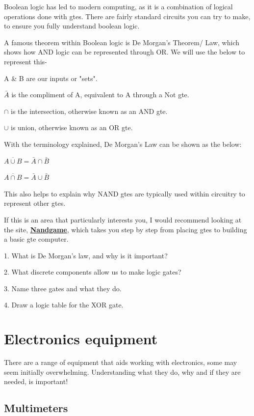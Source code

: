 \documentclass[a4paper,11pt]{report}
\newcommand{\Quiz}[1] %
{
\par\noindent %
\phantomsection %
\todo[inline, color=blue!30]{\textbf{#1}} %
\vspace{1em} %
}
\let\oldhref\href %
\renewcommand{\href}[2]{\oldhref{#1}{\bfseries#2}}
\begin{document}
Boolean logic has led to modern computing, as it is a combination of logical operations done with \gls{gte}s. There are fairly standard circuits you can try to make, to ensure you fully understand boolean logic.

A famous theorem within Boolean logic is De Morgan's Theorem/ Law, which shows how AND logic can be represented through OR. We will use the below to represent this-

A \& B are our inputs or "sets".

$\bar{A}$ is the compliment of A, equivalent to A through a Not \gls{gte}.

$\cap$ is the intersection, otherwise known as an AND \gls{gte}.

$\cup$ is union, otherwise known as an OR \gls{gte}.

With the terminology explained, De Morgan's Law can be shown as the below:

$\overline{A\cup B} = \bar{A}\cap\bar{B}$

$\overline{A\cap B} = \bar{A}\cup\bar{B}$

This also helps to explain why NAND \gls{gte}s are typically used within circuitry to represent other \gls{gte}s.

If this is an area that particularly interests you, I would recommend looking at the site, \href{https://nandgame.com/}{Nandgame}, which takes you step by step from placing \gls{gte}s to building a basic \gls{gte} computer.

\Quiz{Quiz}

1. What is De Morgan's law, and why is it important?

2. What discrete components allow us to make logic gates?

3. Name three gates and what they do.

4. Draw a logic table for the XOR gate.

\pagebreak

\section{Electronics equipment}

There are a range of equipment that aids working with electronics, some may seem initially overwhelming. Understanding what they do, why and if they are needed, is important!

\vspace*{1\baselineskip}

\subsection{Multimeters}
\end{document}
